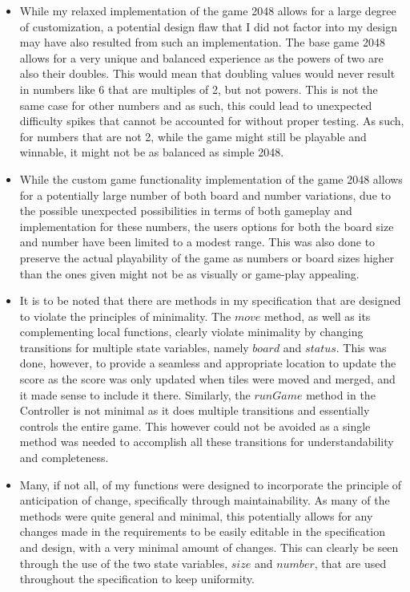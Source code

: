 \documentclass[12pt]{article}
\begin{document}
\begin{itemize}
  \item While my relaxed implementation of the game 2048 allows for a large degree of customization, a potential design flaw that I did not factor into my design may have also resulted from such an implementation. The base game 2048 allows for a very unique and balanced experience as the powers of two are also their doubles. This would mean that doubling values would never result in numbers like 6 that are multiples of 2, but not powers. This is not the same case for other numbers and as such, this could lead to unexpected difficulty spikes that cannot be accounted for without proper testing. As such, for numbers that are not 2, while the game might still be playable and winnable, it might not be as balanced as simple 2048.

  \item While the custom game functionality implementation of the game 2048 allows for a potentially large number of both board and number variations, due to the possible unexpected possibilities in terms of both gameplay and implementation for these numbers, the users options for both the board size and number have been limited to a modest range. This was also done to preserve the actual playability of the game as numbers or board sizes higher than the ones given might not be as visually or game-play appealing.

  \item It is to be noted that there are methods in my specification that are designed to violate the principles of minimality. The $move$ method, as well as its complementing local functions, clearly violate minimality by changing transitions for multiple state variables, namely $board$ and $status$. This was done, however, to provide a seamless and appropriate location to update the score as the score was only updated when tiles were moved and merged, and it made sense to include it there. Similarly, the $runGame$ method in the Controller is not minimal as it does multiple transitions and essentially controls the entire game. This however could not be avoided as a single method was needed to accomplish all these transitions for understandability and completeness.

  \item Many, if not all, of my functions were designed to incorporate the principle of anticipation of change, specifically through maintainability. As many of the methods were quite general and minimal, this potentially allows for any changes made in the requirements to be easily editable in the specification and design, with a very minimal amount of changes. This can clearly be seen through the use of the two state variables, $size$ and $number$, that are used throughout the specification to keep uniformity.


\end{itemize}
\end{document}
